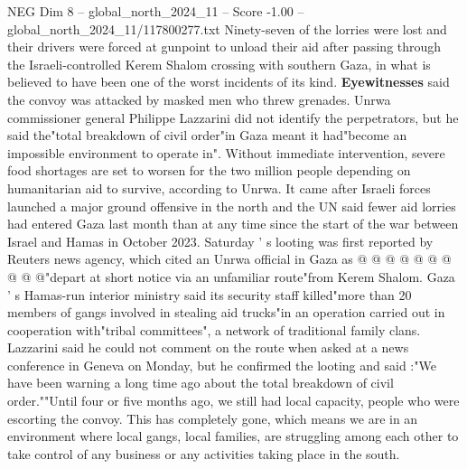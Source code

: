 \begin{textsample}{NEG Dim 8 – global\_north\_2024\_11 – Score -1.00 – global\_north\_2024\_11/117800277.txt}  \label{ex:f8_neg_306}
Ninety-seven of the lorries were lost and their drivers were forced at gunpoint to unload their aid after passing through the Israeli-controlled Kerem Shalom crossing with southern Gaza, in what is believed to have been one of the worst incidents of its kind. \textbf{Eyewitnesses} said the convoy was attacked by masked men who threw grenades.
Unrwa commissioner general Philippe Lazzarini did not identify the perpetrators, but he said the"total breakdown of civil order"in Gaza meant it had"become an impossible environment to operate in".
Without immediate intervention, severe food shortages are set to worsen for the two million people depending on humanitarian aid to survive, according to Unrwa.
It came after Israeli forces launched a major ground offensive in the north and the UN said fewer aid lorries had entered Gaza last month than at any time since the start of the war between Israel and Hamas in October 2023.
Saturday ' s looting was first reported by Reuters news agency, which cited an Unrwa official in Gaza as @ @ @ @ @ @ @ @ @ @"depart at short notice via an unfamiliar route"from Kerem Shalom.
Gaza ' s Hamas-run interior ministry said its security staff killed"more than 20 members of gangs involved in stealing aid trucks"in an operation carried out in cooperation with"tribal committees", a network of traditional family clans.
Lazzarini said he could not comment on the route when asked at a news conference in Geneva on Monday, but he confirmed the looting and said :"We have been warning a long time ago about the total breakdown of civil order.""Until four or five months ago, we still had local capacity, people who were escorting the convoy.
This has completely gone, which means we are in an environment where local gangs, local families, are struggling among each other to take control of any business or any activities taking place in the south.

\end{textsample}
